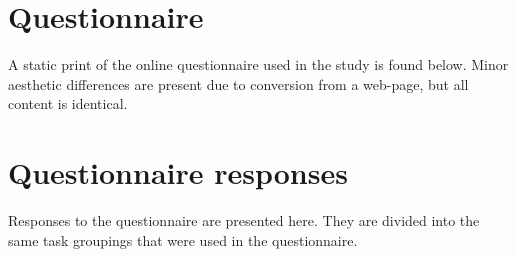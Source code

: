 \begin{appendices}
\makeatletter
\renewcommand{\thesection}{\@arabic\c@section}  %
\makeatother

\section{Questionnaire}

A static print of the online questionnaire used in the study is found below.
Minor aesthetic differences are present due to conversion from a web-page,
but all content is identical.



\section{Questionnaire responses}

Responses to the questionnaire are presented here.
They are divided into the same task groupings that were used in the questionnaire.


\end{appendices}
